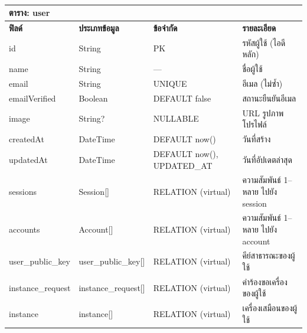 \begin{table}[htbp]
    \caption{}\label{tab3:user_fields}
    \centering
    \renewcommand{\arraystretch}{1.2}
    \small
    \begin{tabular}{p{} p{} p{} p{}}
        \hline
        \multicolumn{4}{l}{\textbf{ตาราง: user}} \\
        \hline
            \textbf{ฟิลด์} & \textbf{ประเภทข้อมูล} & \textbf{ข้อจำกัด} & \textbf{รายละเอียด} \\
        \hline
        id & String & PK & รหัสผู้ใช้ (ไอดีหลัก) \\
        name & String & — & ชื่อผู้ใช้ \\
        email & String & UNIQUE & อีเมล (ไม่ซ้ำ) \\
        emailVerified & Boolean & DEFAULT false & สถานะยืนยันอีเมล \\
        image & String? & NULLABLE & URL รูปภาพโปรไฟล์ \\
        createdAt & DateTime & DEFAULT now() & วันที่สร้าง \\
        updatedAt & DateTime & DEFAULT now(), UPDATED\_AT & วันที่อัปเดตล่าสุด \\
        sessions & Session[] & RELATION (virtual) & ความสัมพันธ์ 1–หลาย ไปยัง session \\
        accounts & Account[] & RELATION (virtual) & ความสัมพันธ์ 1–หลาย ไปยัง account \\
        user\_public\_key & user\_public\_key[] & RELATION (virtual) & คีย์สาธารณะของผู้ใช้ \\
        instance\_request & instance\_request[] & RELATION (virtual) & คำร้องขอเครื่องของผู้ใช้ \\
        instance & instance[] & RELATION (virtual) & เครื่องเสมือนของผู้ใช้ \\
        \hline
    \end{tabular}
\end{table}

